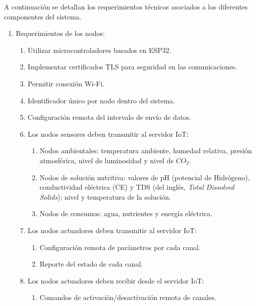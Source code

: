 A continuación se detallan los requerimientos técnicos asociados a los
diferentes componentes del sistema.

\begin{enumerate}
      \item Requerimientos de los nodos:
            \begin{enumerate}
                  \item Utilizar microcontroladores basados en ESP32.
                  \item Implementar certificados TLS para seguridad en las comunicaciones.
                  \item Permitir conexión Wi-Fi.
                  \item Identificador único por nodo dentro del sistema.
                  \item Configuración remota del intervalo de envío de datos.
                  \item Los nodos sensores deben transmitir al servidor IoT:
                        \begin{enumerate}
                              \item Nodos ambientales: temperatura ambiente, humedad relativa, presión atmosférica, nivel de
                                    luminosidad y nivel de $CO_2$.
                              \item Nodos de solución nutritiva: valores de pH (potencial de Hidrógeno),
                                    conductividad eléctrica (CE) y TDS (del inglés, \textit{Total Dissolved Solids}); nivel y
                                    temperatura de la solución.
                              \item Nodos de consumos: agua, nutrientes y energía eléctrica.
                        \end{enumerate}
                  \item Los nodos actuadores deben transmitir al servidor IoT:
                        \begin{enumerate}
                              \item Configuración remota de parámetros por cada canal.
                              \item Reporte del estado de cada canal.
                        \end{enumerate}
                  \item Los nodos actuadores deben recibir desde el servidor IoT:
                        \begin{enumerate}
                              \item Comandos de activación/desactivación remota de canales.
                        \end{enumerate}
            \end{enumerate}


\end{enumerate}
